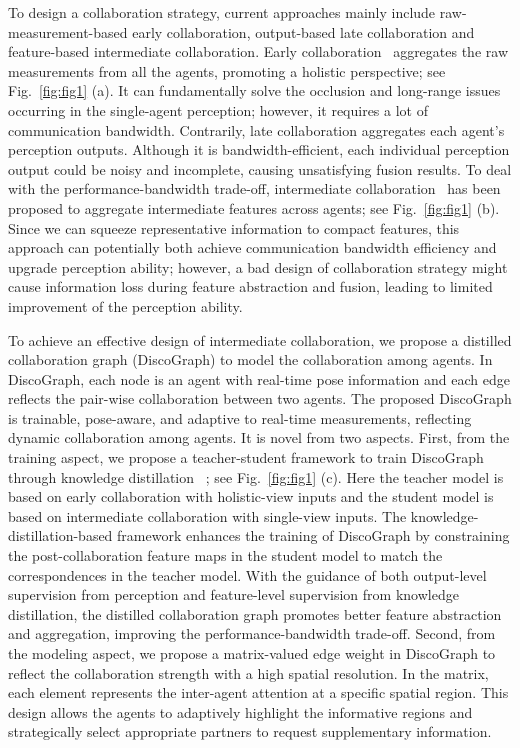 \documentclass{article}
\begin{document}
To design a collaboration strategy, current approaches mainly include raw-measurement-based early collaboration, output-based late collaboration and feature-based intermediate collaboration. Early collaboration~\cite{Chen2019CooperCP} aggregates the raw measurements from all the agents, promoting a holistic perspective; see Fig.~\ref{fig:fig1} (a). It can fundamentally solve the occlusion and long-range issues occurring in the single-agent perception; however, it requires a lot of communication bandwidth. Contrarily, late collaboration aggregates each agent's perception outputs. Although it is bandwidth-efficient, each individual perception output could be noisy and incomplete, causing unsatisfying fusion results. To deal with the performance-bandwidth trade-off, intermediate collaboration~\cite{liu2020when2com,wang2020v2vnet,liu2020who2com} has been proposed to aggregate intermediate features across agents; see Fig.~\ref{fig:fig1} (b).  Since we can squeeze representative information to compact features, this approach can potentially both achieve communication bandwidth efficiency and upgrade perception ability; however, a bad design of collaboration strategy might cause information loss during feature abstraction and fusion, leading to limited improvement of the perception ability.

To achieve an effective design of intermediate collaboration, we propose a distilled collaboration graph (DiscoGraph) to model the collaboration among agents. In DiscoGraph, each node is an agent with real-time pose information and each edge reflects the pair-wise collaboration between two agents. The proposed DiscoGraph is trainable, pose-aware, and adaptive to real-time measurements, reflecting dynamic collaboration among agents.  It is novel from two aspects. First, from the training aspect, we propose a teacher-student framework to train DiscoGraph through knowledge distillation ~\cite{anil2018large,hinton2015distilling,Romero2015FitNetsHF}; see Fig.~\ref{fig:fig1} (c).  Here the teacher model is based on early collaboration with holistic-view inputs and the student model is based on intermediate collaboration with single-view inputs. The knowledge-distillation-based framework enhances the training of DiscoGraph by constraining the post-collaboration feature maps in the student model to match the correspondences in the teacher model. With the guidance of both output-level supervision from perception and feature-level supervision from knowledge distillation, the distilled collaboration graph promotes better feature abstraction and aggregation, improving the performance-bandwidth trade-off. Second, from the modeling aspect, we propose a matrix-valued edge weight in DiscoGraph to reflect the collaboration strength with a high spatial resolution. In the matrix, each element represents the inter-agent attention at a specific spatial region. This design allows the agents to adaptively highlight the informative regions and strategically select appropriate partners to request supplementary information.
\end{document}

